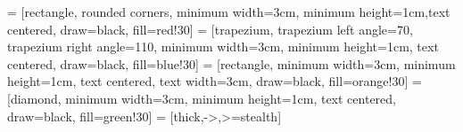 \def\myred{red!65!black}


 = [rectangle, rounded corners, minimum width=3cm, minimum height=1cm,text centered, draw=black, fill=red!30]
 = [trapezium, trapezium left angle=70, trapezium right angle=110, minimum width=3cm, minimum height=1cm, text centered, draw=black, fill=blue!30]
 = [rectangle, minimum width=3cm, minimum height=1cm, text centered, text width=3cm, draw=black, fill=orange!30]
 = [diamond, minimum width=3cm, minimum height=1cm, text centered, draw=black, fill=green!30]
 = [thick,->,>=stealth]
		
